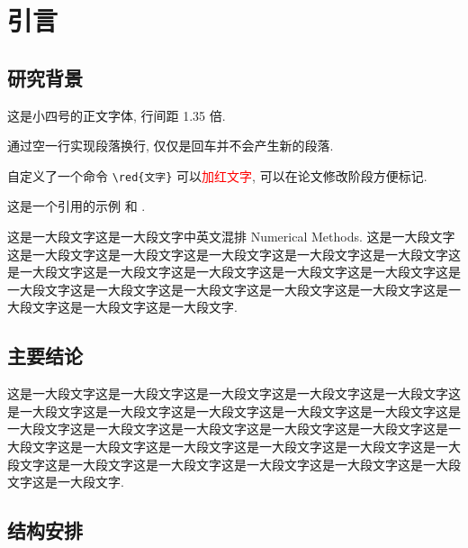 \documentclass[UTF8,openany,twoside,12pt]{book}
\theoremstyle{plain}
\renewcommand{\contentsname}{目~~录}
\newcommand{\red}[1]{\textcolor{red}{#1}}
\begin{document}

\renewcommand\contentsname{目~~录}
\cleardoublepage
{}
\pdfbookmark[chapter]{\contentsname}{toc}
\tableofcontents



\mainmatter   %



\chapter{引言}

\section{研究背景}

这是小四号的正文字体, 行间距 1.35 倍.

通过空一行实现段落换行, 仅仅是回车并不会产生新的段落.

自定义了一个命令 \verb|\red{文字}| 可以\red{加红文字}, 可以在论文修改阶段方便标记.

这是一个引用的示例 \cite{Adams2003}和 \cite{Shen1994,Tadmor2012,TreWei2014}.

这是一大段文字这是一大段文字中英文混排 Numerical Methods. 这是一大段文字这是一大段文字这是一大段文字这是一大段文字这是一大段文字这是一大段文字这是一大段文字这是一大段文字这是一大段文字这是一大段文字这是一大段文字这是一大段文字这是一大段文字这是一大段文字这是一大段文字这是一大段文字这是一大段文字这是一大段文字这是一大段文字.

\section{主要结论}

这是一大段文字这是一大段文字这是一大段文字这是一大段文字这是一大段文字这是一大段文字这是一大段文字这是一大段文字这是一大段文字这是一大段文字这是一大段文字这是一大段文字这是一大段文字这是一大段文字这是一大段文字这是一大段文字这是一大段文字这是一大段文字这是一大段文字这是一大段文字这是一大段文字这是一大段文字这是一大段文字这是一大段文字这是一大段文字这是一大段文字这是一大段文字.



\section{结构安排}
\end{document}
